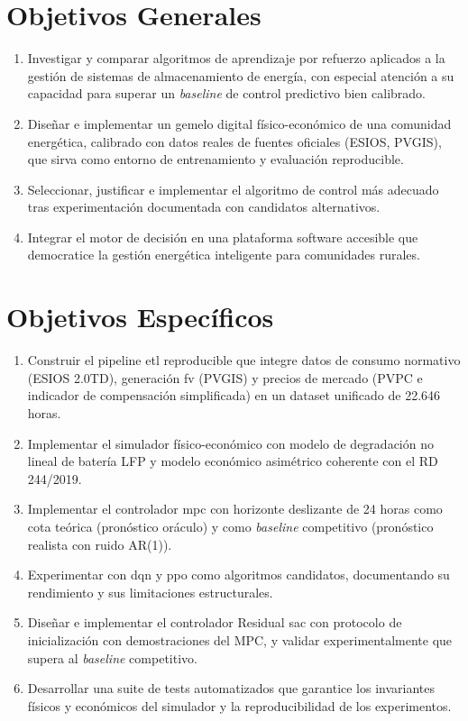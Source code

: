 \documentclass[12pt, a4paper, twoside]{report}
\begin{document}
\section{Objetivos Generales}

\begin{enumerate}[label=\textbf{OG\arabic*.}]
  \item Investigar y comparar algoritmos de aprendizaje por refuerzo aplicados
    a la gestión de sistemas de almacenamiento de energía, con especial atención
    a su capacidad para superar un \textit{baseline} de control predictivo bien
    calibrado.
  \item Diseñar e implementar un gemelo digital físico-económico de una comunidad
    energética, calibrado con datos reales de fuentes oficiales (ESIOS, PVGIS),
    que sirva como entorno de entrenamiento y evaluación reproducible.
  \item Seleccionar, justificar e implementar el algoritmo de control más adecuado
    tras experimentación documentada con candidatos alternativos.
  \item Integrar el motor de decisión en una plataforma software accesible que
    democratice la gestión energética inteligente para comunidades rurales.
\end{enumerate}

\section{Objetivos Específicos}

\begin{enumerate}[label=\textbf{OE\arabic*.}]
  \item Construir el pipeline \acrshort{etl} reproducible que integre datos de
    consumo normativo (ESIOS 2.0TD), generación \acrshort{fv} (PVGIS) y precios
    de mercado (PVPC e indicador de compensación simplificada) en un dataset
    unificado de 22.646 horas.
  \item Implementar el simulador físico-económico con modelo de degradación no
    lineal de batería LFP y modelo económico asimétrico coherente con el
    RD 244/2019.
  \item Implementar el controlador \acrshort{mpc} con horizonte deslizante de
    24 horas como cota teórica (pronóstico oráculo) y como \textit{baseline}
    competitivo (pronóstico realista con ruido AR(1)).
  \item Experimentar con \acrshort{dqn} y \acrshort{ppo} como algoritmos
    candidatos, documentando su rendimiento y sus limitaciones estructurales.
  \item Diseñar e implementar el controlador Residual \acrshort{sac} con
    protocolo de inicialización con demostraciones del MPC, y validar
    experimentalmente que supera al \textit{baseline} competitivo.
  \item Desarrollar una suite de tests automatizados que garantice los
    invariantes físicos y económicos del simulador y la reproducibilidad
    de los experimentos.
\end{enumerate}
\end{document}
